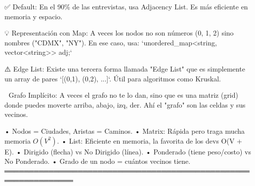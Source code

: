 \begin{dsaentrevistas}

✅ Default: En el 90\% de las entrevistas, usa Adjacency List. Es más
   eficiente en memoria y espacio.

💡 Representación con Map: A veces los nodos no son números (0, 1, 2)
   sino nombres ("CDMX", "NY"). En ese caso, usa:
   `unordered\_map<string, vector<string>> adj;`

⚠️ Edge List: Existe una tercera forma llamada "Edge List" que es 
   simplemente un array de pares `[(0,1), (0,2), ...]`. Útil para 
   algoritmos como Kruskal.

🔑 Grafo Implícito: A veces el grafo no te lo dan, sino que es una
   matriz (grid) donde puedes moverte arriba, abajo, izq, der. Ahí el
   "grafo" son las celdas y sus vecinos.

\end{dsaentrevistas}

\begin{dsaresumen}

• Nodos = Ciudades, Aristas = Caminos.
• Matrix: Rápida pero traga mucha memoria $O(V^2)$.
• List: Eficiente en memoria, la favorita de los devs O(V + E).
• Dirigido (flecha) vs No Dirigido (línea).
• Ponderado (tiene peso/costo) vs No Ponderado.
• Grado de un nodo = cuántos vecinos tiene.
════════════════════════════════════════════════════════════════

\end{dsaresumen}


